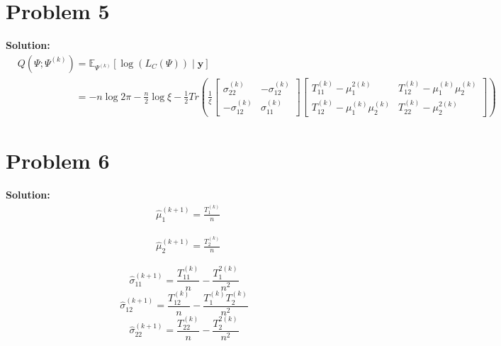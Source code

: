 \documentclass[11pt]{article}
\begin{document}
\section*{Problem 5}
\textbf{Solution:}
	\begin{align}
		&Q(\Psi ; \Psi^{(k)}) = \mathbb{E}_{\Psi^{(k)}} [\log(L_C(\Psi)) \mid \mathbf{y}]\nonumber\\
		&\phantom{Q(\Psi ; \Psi^{(k)})} = -n\log 2\pi - \frac{n}{2} \log \xi - \frac{1}{2} Tr\left(\frac{1}{\xi} 
		 \begin{bmatrix}
		 	\sigma_{22}^{(k)} & -\sigma_{12}^{(k)}\\
		 	-\sigma_{12}^{(k)} & \sigma_{11}^{(k)}
		 \end{bmatrix}
		 \begin{bmatrix}
		 	T_{11}^{(k)} - \mu_1^{2(k)} & T_{12}^{(k)} - \mu_1^{(k)}\mu_2^{(k)}\\
		 	T_{12}^{(k)} - \mu_1^{(k)}\mu_2^{(k)} & T_{22}^{(k)} - \mu_2^{2(k)}
		 \end{bmatrix}
		  \right)\nonumber
	\end{align}
	
\section*{Problem 6}
\textbf{Solution:}
	\begin{align}
		&\hat{\mu}_1^{(k + 1)} = \frac{T_1^{(k)}}{n}\nonumber
	\end{align}
	
	\begin{align}
		&\hat{\mu}_2^{(k + 1)} = \frac{T_2^{(k)}}{n}\nonumber
	\end{align}
	
	\[\hat{\sigma}_{11}^{(k + 1)} = \frac{T_{11}^{(k)}}{n} - \frac{T_1^{2(k)}}{n^2}\]
	\[\hat{\sigma}_{12}^{(k + 1)} = \frac{T_{12}^{(k)}}{n} - \frac{T_1^{(k)}T_2^{(k)}}{n^2}\]
	\[\hat{\sigma}_{22}^{(k + 1)} = \frac{T_{22}^{(k)}}{n} - \frac{T_2^{2(k)}}{n^2}\]
\newpage 


\end{document}
